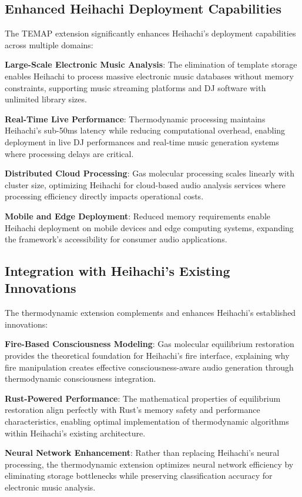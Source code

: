\documentclass[12pt,a4paper]{article}
\begin{document}
\subsection{Enhanced Heihachi Deployment Capabilities}

The TEMAP extension significantly enhances Heihachi's deployment capabilities across multiple domains:

\textbf{Large-Scale Electronic Music Analysis}: The elimination of template storage enables Heihachi to process massive electronic music databases without memory constraints, supporting music streaming platforms and DJ software with unlimited library sizes.

\textbf{Real-Time Live Performance}: Thermodynamic processing maintains Heihachi's sub-50ms latency while reducing computational overhead, enabling deployment in live DJ performances and real-time music generation systems where processing delays are critical.

\textbf{Distributed Cloud Processing}: Gas molecular processing scales linearly with cluster size, optimizing Heihachi for cloud-based audio analysis services where processing efficiency directly impacts operational costs.

\textbf{Mobile and Edge Deployment}: Reduced memory requirements enable Heihachi deployment on mobile devices and edge computing systems, expanding the framework's accessibility for consumer audio applications.

\subsection{Integration with Heihachi's Existing Innovations}

The thermodynamic extension complements and enhances Heihachi's established innovations:

\textbf{Fire-Based Consciousness Modeling}: Gas molecular equilibrium restoration provides the theoretical foundation for Heihachi's fire interface, explaining why fire manipulation creates effective consciousness-aware audio generation through thermodynamic consciousness integration.

\textbf{Rust-Powered Performance}: The mathematical properties of equilibrium restoration align perfectly with Rust's memory safety and performance characteristics, enabling optimal implementation of thermodynamic algorithms within Heihachi's existing architecture.

\textbf{Neural Network Enhancement}: Rather than replacing Heihachi's neural processing, the thermodynamic extension optimizes neural network efficiency by eliminating storage bottlenecks while preserving classification accuracy for electronic music analysis.
\end{document}
